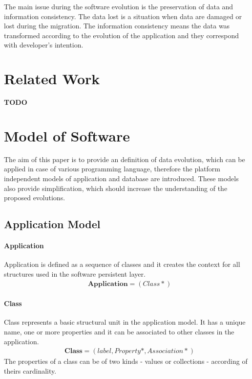 \documentclass[11pt]{article}
\begin{document}
The main issue during the software evolution is the preservation of data and information consistency. The data lost is a situation when data are damaged or lost during the migration. The information consistency means the data was transformed according to the evolution of the application and they correspond with developer's intention. 


\section{Related Work}
\label{sec:related-work}

\textbf{TODO}

\section{Model of Software}
\label{sec:models}
The aim of this paper is to provide an definition of data evolution, which can be applied in case of various programming language, therefore the platform independent models of application and database are introduced. These models also provide simplification, which should increase the understanding of the proposed evolutions.

\subsection{Application Model}
\paragraph{Application} Application is defined as a sequence of classes and it creates the context for all structures used in the software persistent layer.
\begin{align*}
& \mathbf{Application} = (Class*)
\end{align*}

\paragraph{Class} Class represents a basic structural unit in the application model. It has a unique name, one or more properties and it can be associated to other classes in the application. 
\begin{align*}
& 	\mathbf{Class} = (label, Property*, Association*)
\end{align*}
The properties of a class can be of two kinds - values or collections - according of theirs cardinality.
	 
\end{document}
